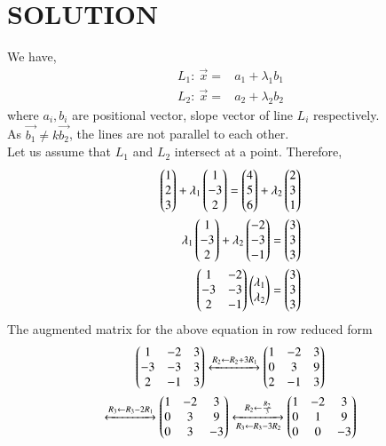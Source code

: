 \documentclass[journal,12pt,twocolumn]{IEEEtran}
\begin{document}
\section*{SOLUTION}
We have,
\begin{align}
    \label{eq:3}                       
    L_{1}: \: \Vec{x}={}&a_{1}+\lambda_{1}b_{1}\\
    \label{eq:4}
    L_{2}: \: \Vec{x}={}&a_{2}+\lambda_{2}b_{2}
\end{align}
where $a_{i},b_{i}$ are positional vector, slope vector of line $L_{i}$ respectively.\\
As $\Vec{b_{1}}\neq k \Vec{b_{2}}$, the lines are not parallel to each other.
\\ Let us assume that $L_{1}$ and $L_{2}$ intersect at a point. Therefore,
\begin{align}
    \label{eq:5}
    \begin{pmatrix}1 \\ 2\\ 3 \end{pmatrix} +\lambda_{1}\begin{pmatrix}1 \\ -3 \\ 2\end{pmatrix} = \begin{pmatrix}4 \\ 5\\ 6\end{pmatrix} + \lambda_{2}\begin{pmatrix}2 \\ 3 \\ 1\end{pmatrix} \\
    \label{eq:6}
    \lambda_{1}\begin{pmatrix}1 \\ -3 \\ 2\end{pmatrix} + \lambda_{2}\begin{pmatrix}-2 \\ -3 \\ -1\end{pmatrix}= \begin{pmatrix}3 \\ 3\\ 3 \end{pmatrix} \\
    \label{eq:7}
    \begin{pmatrix}1 & -2\\ -3 &-3 \\ 2 & -1\end{pmatrix}\begin{pmatrix}\lambda_{1}\\ \lambda_{2}\end{pmatrix}=
    \begin{pmatrix}3 \\ 3\\ 3 \end{pmatrix}
\end{align}
The augmented matrix for the above equation in row reduced form
\begin{multline}
    \begin{pmatrix}1 & -2 & 3\\ -3 &-3 & 3\\ 2 & -1 & 3\end{pmatrix} \xleftrightarrow{R_{2}\leftarrow R_{2}+3R_{1}}
     \begin{pmatrix}1 & -2 & 3\\ 0 &3 & 9\\ 2 & -1 & 3\end{pmatrix}\\
     \xleftrightarrow{R_{3}\leftarrow R_{3}-2R_{1}}
     \begin{pmatrix}1 & -2 & 3\\ 0 &3 & 9\\ 0 & 3 & -3\end{pmatrix}
   \xleftrightarrow[R_{3}\leftarrow R_{3}-3R_{2}]{R_{2}\leftarrow\frac{R_{2}}{3}}
    \begin{pmatrix}1 & -2 & 3\\ 0 & 1 & 9\\ 0 & 0 & -3\end{pmatrix}
\end{multline}
\end{document}
